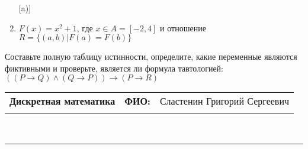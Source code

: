 \documentclass[10pt]{exam}
\newcommand{\class}{Дискретная математика}
\newcommand{\examdate}{}
\begin{document}
\begin{questions}
\begin{enumerate} [a)]
\item $F(x)=x^{2}+1$, где $x \in A = [-2, 4]$ и отношение $R = \{(a,b)|F(a) = F(b)\}$
\end{enumerate}\question Составьте полную таблицу истинности, определите, какие переменные являются фиктивными и проверьте, является ли формула тавтологией:
$(( P \rightarrow Q) \land (Q \rightarrow P)) \rightarrow (P \rightarrow R)$

\end{questions}
\newpage
\begin{flushright}
\begin{tabular}{p{2.8in} r l}
\textbf{\class} & \textbf{ФИО:} &Сластенин Григорий Сергеевич
\\

\textbf{\examdate} &&\\
\end{tabular}\\
\end{flushright}
\rule[1ex]{\textwidth}{.1pt}
\end{document}
